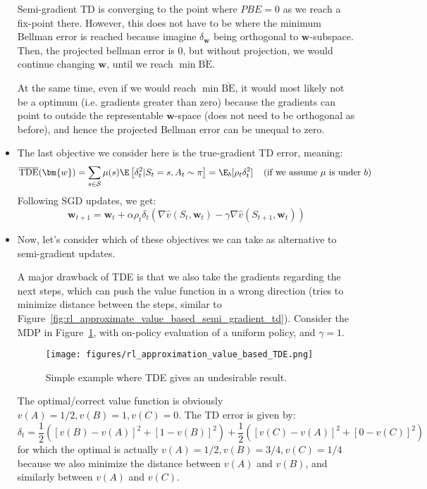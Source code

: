 \begin{itemize}
	Semi-gradient TD is converging to the point where $PBE=0$ as we reach a fix-point there. However, this does not have to be where the minimum Bellman error is reached because imagine $\delta_{\bm{w}}$ being orthogonal to $\bm{w}$-subspace. Then, the projected bellman error is 0, but without projection, we would continue changing $\bm{w}$, until we reach $\min \overline{\text{BE}}$.
	
	At the same time, even if we would reach $\min \overline{\text{BE}}$, it would most likely not be a optimum (i.e. gradients greater than zero) because the gradients can point to outside the representable $\bm{w}$-space (does not need to be orthogonal as before), and hence the projected Bellman error can be unequal to zero.
	
	\item The last objective we consider here is the true-gradient TD error, meaning: $$\overline{\text{TDE}}(\bm{w})=\sum_{s\in\mathcal{S}}\mu(s)\E\left[\delta_t^2 |S_t=s,A_t\sim \pi\right] = \E_{b}[\rho_t \delta_t^2] \hspace{4mm}\text{(if we assume $\mu$ is under $b$)}$$
	Following SGD updates, we get:
	$$\bm{w}_{t+1}=\bm{w}_t + \alpha \rho_t \delta_t (\nabla \hat{v}(S_t,\bm{w}_t) - \gamma \nabla \hat{v}(S_{t+1},\bm{w}_t))$$
	
	\item Now, let's consider which of these objectives we can take as alternative to semi-gradient updates. 
	
	A major drawback of TDE is that we also take the gradients regarding the next steps, which can push the value function in a wrong direction (tries to minimize distance between the steps, similar to Figure~\ref{fig:rl_approximate_value_based_semi_gradient_td}). Consider the MDP in Figure~\ref{fig:rl_approximation_value_based_TDE}, with on-policy evaluation of a uniform policy, and $\gamma=1$.
	
	\begin{figure}[ht!]
		\centering
		\texttt{[image: figures/rl\_approximation\_value\_based\_TDE.png]}
		\caption{Simple example where TDE gives an undesirable result.}
		\label{fig:rl_approximation_value_based_TDE}
	\end{figure}

	The optimal/correct value function is obviously $v(A)=1/2, v(B)=1, v(C)=0$. The TD error is given by:
	$$\delta_t=\frac{1}{2}\left(\left[v(B)-v(A)\right]^2 + \left[1-v(B)\right]^2\right)+\frac{1}{2}\left(\left[v(C)-v(A)\right]^2 + \left[0-v(C)\right]^2\right)$$
	for which the optimal is actually $v(A)=1/2, v(B)=3/4, v(C)=1/4$ because we also minimize the distance between $v(A)$ and $v(B)$, and similarly between $v(A)$ and $v(C)$.
	

\end{itemize}
